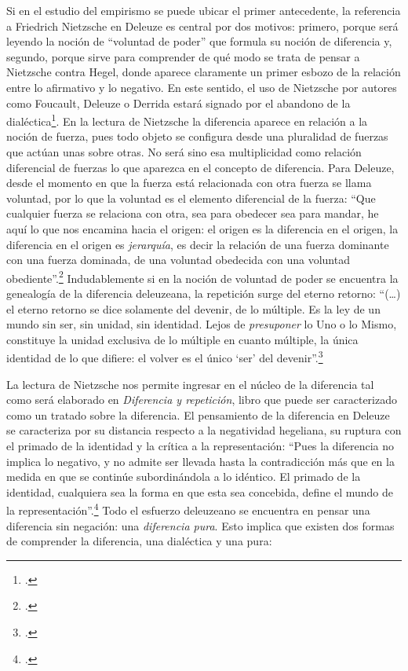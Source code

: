 Si en el estudio del empirismo se puede ubicar el primer antecedente, la referencia a Friedrich Nietzsche en Deleuze es central por dos motivos: primero, porque será leyendo la noción de \enquote{voluntad de poder} que formula su noción de diferencia y, segundo, porque sirve para comprender de qué modo se trata de pensar a Nietzsche contra Hegel, donde aparece claramente un primer esbozo de la relación entre lo afirmativo y lo negativo. En este sentido, el uso de Nietzsche por autores como Foucault, Deleuze o Derrida estará signado por el abandono de la dialéctica\footcite{@6971-SAZBON2009,@6972-CASTRO2002}. En la lectura de Nietzsche la diferencia aparece en relación a la noción de fuerza, pues todo objeto se configura desde una pluralidad de fuerzas que actúan unas sobre otras. No será sino esa multiplicidad como relación diferencial de fuerzas lo que aparezca en el concepto de diferencia. Para Deleuze, desde el momento en que la fuerza está relacionada con otra fuerza se llama voluntad, por lo que la voluntad es el elemento diferencial de la fuerza: \enquote{Que cualquier fuerza se relaciona con otra, sea para obedecer sea para mandar, he aquí lo que nos encamina hacia el origen: el origen es la diferencia en el origen, la diferencia en el origen es \emph{jerarquía}, es decir la relación de una fuerza dominante con una fuerza dominada, de una voluntad obedecida con una voluntad obediente}.\footcite[16]{@6973-DELEUZE1998} Indudablemente si en la noción de voluntad de poder se encuentra la genealogía de la diferencia deleuzeana, la repetición surge del eterno retorno: \enquote{(\dots) el eterno retorno se dice solamente del devenir, de lo múltiple. Es la ley de un mundo sin ser, sin unidad, sin identidad. Lejos de \emph{presuponer} lo Uno o lo Mismo, constituye la unidad exclusiva de lo múltiple en cuanto múltiple, la única identidad de lo que difiere: el volver es el único \enquote{ser} del devenir}.\footcite[163]{@6974-DELEUZE2005}

La lectura de Nietzsche nos permite ingresar en el núcleo de la diferencia tal como será elaborado en \emph{Diferencia y repetición}, libro que puede ser caracterizado como un tratado sobre la diferencia. El pensamiento de la diferencia en Deleuze se caracteriza por su distancia respecto a la negatividad hegeliana, su ruptura con el primado de la identidad y la crítica a la representación: \enquote{Pues la diferencia no implica lo negativo, y no admite ser llevada hasta la contradicción más que en la medida en que se continúe subordinándola a lo idéntico. El primado de la identidad, cualquiera sea la forma en que esta sea concebida, define el mundo de la representación}.\footcite[15]{@6961-DELEUZE2002} Todo el esfuerzo deleuzeano se encuentra en pensar una diferencia sin negación: una \emph{diferencia pura}. Esto implica que existen dos formas de comprender la diferencia, una dialéctica y una pura:

